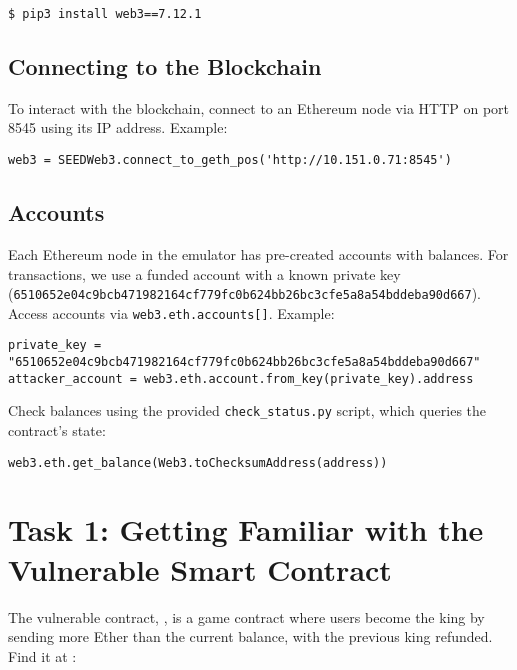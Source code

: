 \begin{lstlisting}
$ pip3 install web3==7.12.1
\end{lstlisting}

\subsection{Connecting to the Blockchain}
\label{sec:sub:ports}

To interact with the blockchain, connect to an Ethereum node via HTTP on port 8545 using its IP address. Example:

\begin{lstlisting}
web3 = SEEDWeb3.connect_to_geth_pos('http://10.151.0.71:8545')
\end{lstlisting}

\subsection{Accounts}

Each Ethereum node in the emulator has pre-created accounts with balances. For transactions, we use a funded account with a known private key (\texttt{\scriptsize 6510652e04c9bcb471982164cf779fc0b624bb26bc3cfe5a8a54bddeba90d667}). Access accounts via \texttt{web3.eth.accounts[]}. Example:

\begin{lstlisting}
private_key = "6510652e04c9bcb471982164cf779fc0b624bb26bc3cfe5a8a54bddeba90d667"
attacker_account = web3.eth.account.from_key(private_key).address
\end{lstlisting}

Check balances using the provided \texttt{check\_status.py} script, which queries the contract’s state:

\begin{lstlisting}
web3.eth.get_balance(Web3.toChecksumAddress(address))
\end{lstlisting}

\section{Task 1: Getting Familiar with the Vulnerable Smart Contract}

The vulnerable contract, , is a game contract where users become the king by sending more Ether than the current balance, with the previous king refunded. Find it at :

